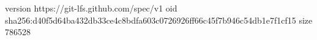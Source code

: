 version https://git-lfs.github.com/spec/v1
oid sha256:d40f5d64ba432db33ce4c8bdfa603c0726926ff66c45f7b946c54db1e7f1cf15
size 786528
